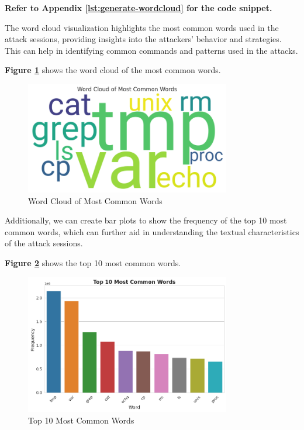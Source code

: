        \textbf{Refer to Appendix \ref{lst:generate-wordcloud} for the code snippet.}

        The word cloud visualization highlights the most common words used in the attack sessions, providing insights into the attackers' behavior and strategies. This can help in identifying common commands and patterns used in the attacks.

        \textbf{Figure \ref{fig:word-cloud}} shows the word cloud of the most common words.

        \begin{figure}[h]
            \centering
            \includegraphics[width=0.8\textwidth]{../figures/plots/section1/word_cloud_of_most_common_words.png}
            \caption{Word Cloud of Most Common Words}
            \label{fig:word-cloud}
        \end{figure}

        Additionally, we can create bar plots to show the frequency of the top 10 most common words, which can further aid in understanding the textual characteristics of the attack sessions.

        \textbf{Figure \ref{fig:common-words}} shows the top 10 most common words.

        \begin{figure}[h]
            \centering
            \includegraphics[width=0.8\textwidth]{../figures/plots/section1/top_10_most_common_words.png}
            \caption{Top 10 Most Common Words}
            \label{fig:common-words}
        \end{figure}

